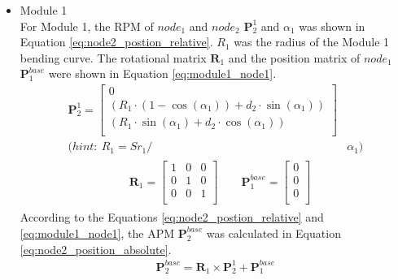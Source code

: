 \begin{itemize}
    \item Module 1 \\
    For Module 1, the RPM of $node_1$ and $node_2$ $\textbf{P}_{2}^{1}$ and $\alpha_1$ was shown 
    in Equation \ref{eq:node2_postion_relative}. $R_1$ was the radius of the Module 1 bending curve. The rotational 
    matrix $\textbf{R}_{1}$ and the position matrix of $node_1$ $\textbf{P}_{1}^{base}$ were shown in Equation 
    \ref*{eq:module1_node1}.
    \begin{align}
        \textbf{P}_{2}^{1} = 
        \begin{bmatrix}
            0 \\
            (R_1\cdot(1-\cos(\alpha_1)) + d_2\cdot \sin(\alpha_1)) \\
            (R_1\cdot \sin(\alpha_1) + d_2\cdot \cos(\alpha_1)) \\
        \end{bmatrix}&
        \label{eq:node2_postion_relative} \\
        \nonumber (hint: \ R_1 = {Sr}_1/ &\alpha_1)
    \end{align}
    \vspace{-15mm}
    \begin{align}
        &\begin{aligned}
            \textbf{R}_{1} = 
            \begin{bmatrix}
                1 & 0 & 0 \\
                0 & 1 & 0 \\
                0 & 0 & 1 \\
            \end{bmatrix}
            \qquad
            \textbf{P}_{1}^{base} = 
            \begin{bmatrix}
                0 \\ 0 \\ 0\\
            \end{bmatrix}
        \end{aligned}
        \label{eq:module1_node1} 
    \end{align}
    According to the Equations \ref{eq:node2_postion_relative} and \ref{eq:module1_node1}, the APM 
    $\textbf{P}_{2}^{base}$ was calculated in Equation \ref{eq:node2_position_absolute}.
    \begin{align}
        \textbf{P}_{2}^{base} = \textbf{R}_{1} \times \textbf{P}_{2}^{1} + \textbf{P}_{1}^{base}
        \label{eq:node2_position_absolute}

\end{align}
\end{itemize}
